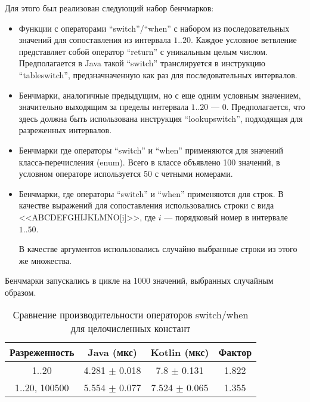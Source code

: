 Для этого был реализован следующий набор бенчмарков:
\begin{itemize}
    \item Функции с операторами ``switch''/``when'' с набором из последовательных значений
    для сопоставления из интервала $1..20$.
    Каждое условное ветвление представляет собой оператор ``return'' с уникальным целым числом.
    Предполагается в Java такой ``switch'' транслируется в инструкцию ``tableswitch'',
    предзначначенную как раз для последовательных интервалов.

    \item Бенчмарки, аналогичные предыдущим, но с еще одним условным значением, значительно
    выходящим за пределы интервала $1..20$ --- $0$.
    Предполагается, что здесь должна быть использована инструкция ``lookupswitch'', подходящая
    для разреженных интервалов.

    \item Бенчмарки где операторы ``switch'' и ``when'' применяются для значений класса-перечисления
    (enum).
    Всего в классе объявлено 100 значений, в условном операторе используется 50 с четными номерами.

    \item Бенчмарки, где операторы ``switch'' и ``when'' применяются для строк.
    В качестве выражений для сопоставления использовались строки с вида <<ABCDEFGHIJKLMNO[i]>>,
    где $i$ --- порядковый номер в интервале $1..50$.

    В качестве аргументов использовались случайно выбранные строки из этого же множества.
\end{itemize}

Бенчмарки запускались в цикле на 1000 значений, выбранных случайным образом.

\begin{table}[h]
\begin{center}
\begin{tabular}{|c|c|c|c|} \hline
Разреженность & Java (мкс) & Kotlin (мкс) & Фактор \\ \hline
1..20 & 4.281 $\pm$ 0.018 & 7.8 $\pm$ 0.131 & 1.822\\ \hline
1..20, 100500 & 5.554 $\pm$ 0.077 & 7.524 $\pm$ 0.065 & 1.355\\ \hline
\end{tabular}
\caption{Сравнение производительности операторов switch/when для целочисленных констант}
\end{center}
\end{table}

